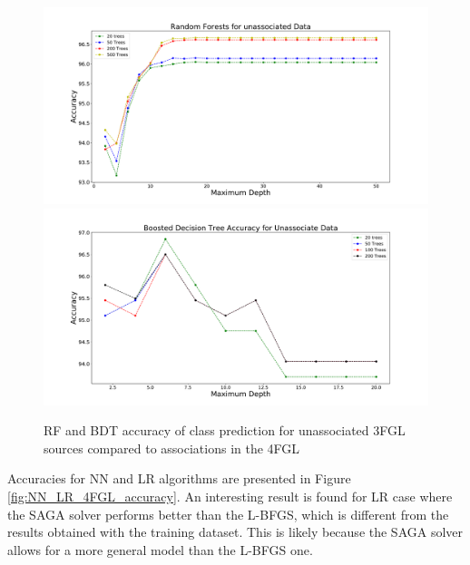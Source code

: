 \begin{figure}[h]
\includegraphics[width=\twopicsp\textwidth]{plots/unassoc2.pdf}
\includegraphics[width=\twopicsp\textwidth]{plots/unassoc_complex.pdf}
\caption{RF and BDT accuracy of class prediction for unassociated 3FGL sources compared to associations in the 4FGL}
\label{fig:RF_BDT_4FGL_accuracy}
\end{figure}

Accuracies for NN and LR algorithms are presented in Figure \ref{fig:NN_LR_4FGL_accuracy}.
An interesting result is found for LR case where the SAGA solver performs better than the L-BFGS, which is different from the results obtained with the training dataset. This is likely because the SAGA solver allows for a more general model than the L-BFGS one. 

